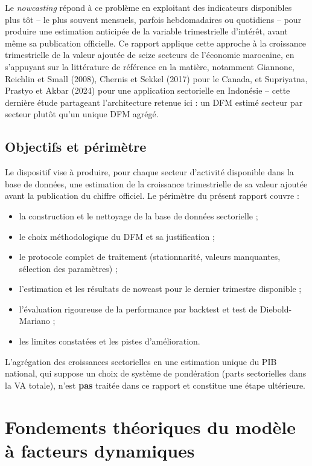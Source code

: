 \documentclass[11pt,a4paper]{report}
\begin{document}
Le \emph{nowcasting} répond à ce problème en exploitant des indicateurs disponibles plus tôt -- le plus souvent mensuels, parfois hebdomadaires ou quotidiens -- pour produire une estimation anticipée de la variable trimestrielle d'intérêt, avant même sa publication officielle. Ce rapport applique cette approche à la croissance trimestrielle de la valeur ajoutée de seize secteurs de l'économie marocaine, en s'appuyant sur la littérature de référence en la matière, notamment Giannone, Reichlin et Small (2008), Chernis et Sekkel (2017) pour le Canada, et Supriyatna, Prastyo et Akbar (2024) pour une application sectorielle en Indonésie -- cette dernière étude partageant l'architecture retenue ici : un DFM estimé secteur par secteur plutôt qu'un unique DFM agrégé.

\section{Objectifs et périmètre}

Le dispositif vise à produire, pour chaque secteur d'activité disponible dans la base de données, une estimation de la croissance trimestrielle de sa valeur ajoutée avant la publication du chiffre officiel. Le périmètre du présent rapport couvre :
\begin{itemize}[nosep]
  \item la construction et le nettoyage de la base de données sectorielle ;
  \item le choix méthodologique du DFM et sa justification ;
  \item le protocole complet de traitement (stationnarité, valeurs manquantes, sélection des paramètres) ;
  \item l'estimation et les résultats de nowcast pour le dernier trimestre disponible ;
  \item l'évaluation rigoureuse de la performance par backtest et test de Diebold-Mariano ;
  \item les limites constatées et les pistes d'amélioration.
\end{itemize}

L'agrégation des croissances sectorielles en une estimation unique du PIB national, qui suppose un choix de système de pondération (parts sectorielles dans la VA totale), n'est \textbf{pas} traitée dans ce rapport et constitue une étape ultérieure.


\chapter{Fondements théoriques du modèle à facteurs dynamiques}
\end{document}
